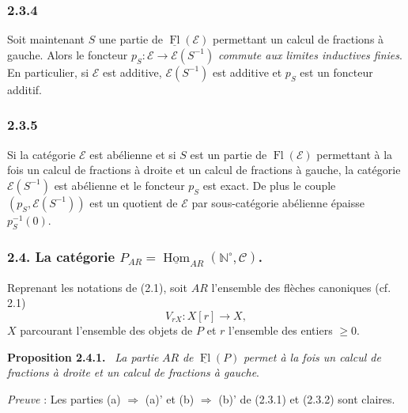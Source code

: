 \documentclass[11pt]{article}
\providecommand{\NN}{\mathbb{N}}
\newenvironment{statement}[1]{\par\medskip\noindent\textbf{#1.}\ }{\par\medskip}
\DeclareMathOperator{\Hom}{Hom}
\providecommand{\uHom}{\underline{\Hom}}
\providecommand{\Hom}{\operatorname{Hom}}
\providecommand{\Fl}{\operatorname{Fl}}
\providecommand{\NN}{\mathbb N}
\providecommand{\cC}{\mathcal C}
\providecommand{\cE}{\mathcal E}
\providecommand{\cC}{\mathcal C}
\providecommand{\Hom}{\operatorname{Hom}}
\begin{document}
\subsubsection*{2.3.4}
Soit maintenant $S$ une partie de $\underline{\Fl}(\cE)$ permettant un calcul de fractions à gauche. Alors le foncteur $p_S:\cE\to\cE(S^{-1})$ \emph{commute aux limites inductives finies}. En particulier, si $\cE$ est additive, $\cE(S^{-1})$ est additive et $p_S$ est un foncteur additif.

\subsubsection*{2.3.5}
Si la
catégorie $\cE$ est abélienne et si $S$ est un partie de $\Fl(\cE)$ permettant à la fois un calcul de fractions à droite et un calcul de fractions à gauche, la catégorie $\cE(S^{-1})$ est abélienne et le foncteur $p_S$ est exact. De plus le couple $(p_S,\cE(S^{-1}))$ est un quotient de $\cE$ par sous-catégorie abélienne épaisse $p_S^{-1}(0)$.

\subsubsection*{2.4. La catégorie $P_{AR}=\uHom_{AR}(\NN^\circ,\cC)$.}
Reprenant les notations de (2.1), soit $AR$ l'ensemble des flèches canoniques (cf. 2.1)
\[
V_{rX}:X[r]\longrightarrow X,
\]
$X$ parcourant l'ensemble des objets de $P$ et $r$ l'ensemble des entiers $\ge0$.

\begin{statement}{Proposition 2.4.1}
\emph{La partie} $AR$ \emph{de} $\underline{\Fl}(P)$ \emph{permet à la fois un calcul de fractions à droite et un calcul de fractions à gauche}.
\end{statement}

\emph{Preuve} : Les parties (a) $\Rightarrow$ (a)' et (b) $\Rightarrow$ (b)' de (2.3.1) et (2.3.2) sont claires.
\end{document}
